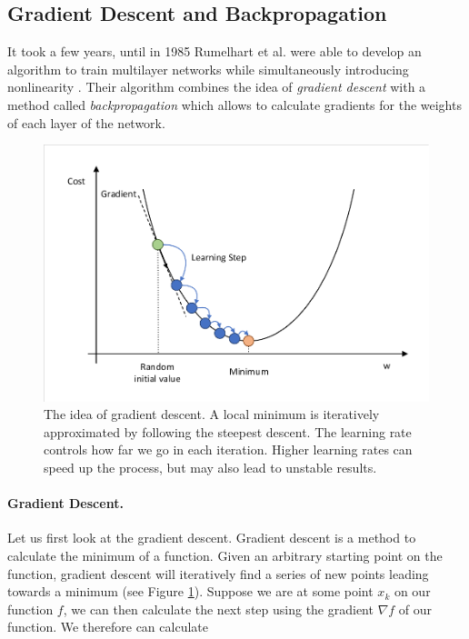 \subsection{Gradient Descent and Backpropagation} \label{sec:Backpropagation}
It took a few years, until in 1985 Rumelhart et al. were able to develop an algorithm to train multilayer networks while simultaneously introducing nonlinearity \cite{rumelhart1985learning}. Their algorithm combines the idea of \textit{gradient descent} with a method called \textit{backpropagation} which allows to calculate gradients for the weights of each layer of the network.

\begin{figure}[ht]
  
  \begin{center}
      \includegraphics[trim=10px 10px 10px 10px, clip, width=0.75\columnwidth]{figures/deeplearning/GradientDescent.pdf}
  \end{center}
  
  \caption[Gradient Descent]{The idea of gradient descent. A local minimum is iteratively approximated by following the steepest descent. The learning rate controls how far we go in each iteration. Higher learning rates can speed up the process, but may also lead to unstable results.}
  \label{fig:GradientDescent}
\end{figure}

\paragraph{Gradient Descent.} Let us first look at the gradient descent. Gradient descent is a method to calculate the minimum of a function. Given an arbitrary starting point on the function, gradient descent will iteratively find a series of new points leading towards a minimum (see Figure \ref{fig:GradientDescent}). Suppose we are at some point $x_k$ on our function $f$, we can then calculate the next step using the gradient $\nabla f$ of our function. We therefore can calculate 

